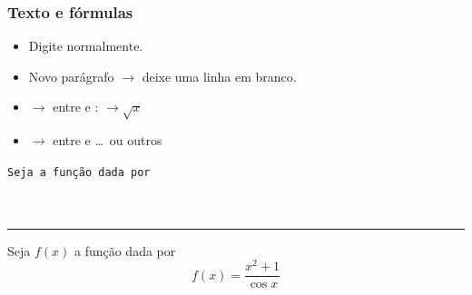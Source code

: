 \begin{frame}
  \frametitle{Texto e fórmulas}
  
  \begin{itemize}
  \item Digite  normalmente.
  \item Novo parágrafo $\to$ deixe uma linha em branco.
  \item {} $\to$ entre \purple{\texttt{\dolar}} e \purple{\texttt{\dolar}}: \quad
    \texttt{\purple{\dolar}\purple{\dolar}}
    $\to \sqrt{x}$
  \item {} $\to$ entre \blue{\texttt{\string\[}} e
      \blue{\texttt{\string\]}}\dots\ ou outros
  \end{itemize}

  \begin{exemplo}\small
        \texttt{Seja \purple{\dolar{}}\purple{\dolar{}} a função dada por\\
          \purple{\string\[}\\
              \ \ \\
              \purple{\string\]}}

        \bigskip\hrule\bigskip

        Seja $f(x)$ a função dada por
        \[
          f(x) = \frac{x^2 + 1}{\cos x}
        \]
  \end{exemplo}

\end{frame}




